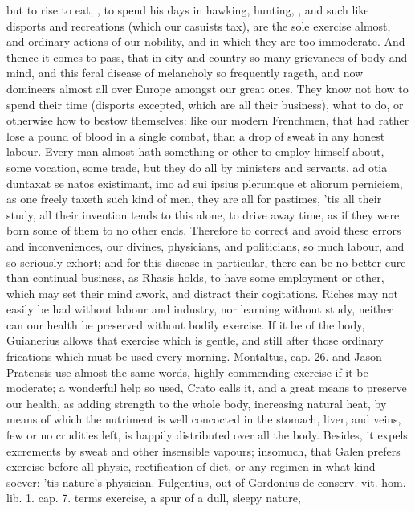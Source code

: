 {but to rise to eat, \etc{}, to spend his days in hawking, hunting, \etc{},
and such like disports and recreations (which our casuists tax),
are the sole exercise almost, and ordinary actions of our nobility, and
in which they are too immoderate. And thence it comes to pass, that in
city and country so many grievances of body and mind, and this feral
disease of melancholy so frequently rageth, and now domineers almost
all over Europe amongst our great ones. They know not how to spend
their time (disports excepted, which are all their business), what to
do, or otherwise how to bestow themselves: like our modern Frenchmen,
that had rather lose a pound of blood in a single combat, than a drop
of sweat in any honest labour. Every man almost hath something or other
to employ himself about, some vocation, some trade, but they do all by
ministers and servants, ad otia duntaxat se natos existimant, imo ad
sui ipsius plerumque et aliorum perniciem, as one freely taxeth
such kind of men, they are all for pastimes, 'tis all their study, all
their invention tends to this alone, to drive away time, as if they
were born some of them to no other ends. Therefore to correct and avoid
these errors and inconveniences, our divines, physicians, and
politicians, so much labour, and so seriously exhort; and for this
disease in particular, there can be no better cure than continual
business, as Rhasis holds, to have some employment or other, which may
set their mind awork, and distract their cogitations. Riches may not
easily be had without labour and industry, nor learning without study,
neither can our health be preserved without bodily exercise. If it be
of the body, Guianerius allows that exercise which is gentle, and
still after those ordinary frications which must be used every morning.
Montaltus, cap. 26. and Jason Pratensis use almost the same words,
highly commending exercise if it be moderate; a wonderful help so used,
Crato calls it, and a great means to preserve our health, as adding
strength to the whole body, increasing natural heat, by means of which
the nutriment is well concocted in the stomach, liver, and veins, few
or no crudities left, is happily distributed over all the body.
Besides, it expels excrements by sweat and other insensible vapours;
insomuch, that Galen prefers exercise before all physic,
rectification of diet, or any regimen in what kind soever; 'tis
nature's physician. Fulgentius, out of Gordonius de conserv. vit.
hom. lib. 1. cap. 7. terms exercise, a spur of a dull, sleepy nature,
}
